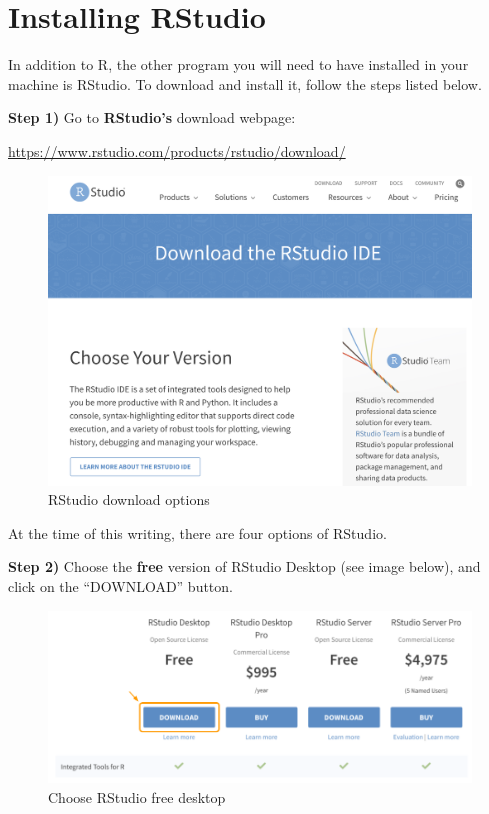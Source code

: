 \documentclass[
]{book}
\begin{document}
\hypertarget{installing-rstudio}{%
\section{Installing RStudio}\label{installing-rstudio}}

In addition to R, the other program you will need to have installed in your
machine is RStudio. To download and install it, follow the steps listed below.

\textbf{Step 1)} Go to \textbf{RStudio's} download webpage:

\url{https://www.rstudio.com/products/rstudio/download/}

\begin{figure}

{\centering \includegraphics[width=0.6\linewidth]{images/install/rstudio-download} 

}

\caption{RStudio download options}\label{fig:unnamed-chunk-10}
\end{figure}

At the time of this writing, there are four options of RStudio.

\textbf{Step 2)} Choose the \textbf{free} version of RStudio Desktop (see image below),
and click on the ``DOWNLOAD'' button.

\begin{figure}

{\centering \includegraphics[width=0.6\linewidth]{images/install/rstudio-free} 

}

\caption{Choose RStudio free desktop}\label{fig:unnamed-chunk-11}
\end{figure}
\end{document}
